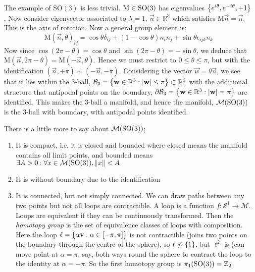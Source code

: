 \begin{examplebox}[$\textrm{SO}(3)$]
The example of $\textrm{SO}(3)$ is less trivial. $\text{M} \in \SO{3}$ has eigenvalues $\set{e^{i\theta}, e^{-i\theta}, +1}$. Now consider eigenvector associated to $\lambda = 1$, $\vec n \in \mathbb{R}^3$ which satisfies $\text{M} \vec n = \vec n$. This is the axis of rotation. Now a general group element is;
\begin{equation}
\text{M}(\vec n, \theta)_{ij} = \cos \theta \delta_{ij} + (1- \cos \theta) n_i n_j + \sin \theta \epsilon_{ijk} n_k
\end{equation}
Now since $\cos(2\pi - \theta) = \cos \theta$ and $\sin(2\pi - \theta) = -\sin \theta$, we deduce that $\text{M}(\vec n, 2\pi - \theta) = \text{M}(-\vec n, \theta)$. Hence we must restrict to $0 \leq \theta \leq \pi$, but with the identification $(\vec n, +\pi) \sim (-\vec n, -\pi)$. Considering the vector $\vec w = \theta \vec n$, we see that it lies within the $3$-ball, $\mathcal{B}_3 = \set{\vec w \in \mathbb{R}^3 : \abs{\vec w} \leq \pi} \subset \mathbb{R}^3$ with the additional structure that antipodal points on the boundary, $\del \mathcal{B}_3 = \set{\vec w \in \mathbb{R}^3 : \abs{\vec w} = \pi}$ are identified. This makes the $3$-ball a manifold, and hence the manifold, $\mathcal{M}\left(\SO{3}\right)$ is the $3$-ball with boundary, with antipodal points identified.\footnotemark
\end{examplebox}
There is a little more to say about $\mathcal{M}\left(\SO{3}\right)$;
\begin{enumerate}
\item It is compact, i.e. it is closed and bounded where closed means the manifold contains all limit points, and bounded means $\exists A > 0 : \forall x \in \mathcal{M}\left(\SO{3}\right), \| x \| < A$
\item It is without boundary due to the identification
\item It is connected, but not simply connected. We can draw paths between any two points but not all loops are contractible. A loop is a function $f : \mathcal{S}^1 \rightarrow \mathcal{M}$. Loops are equivalent if they can be continuously transformed. Then the \emph{homotopy group} is the set of equivalence classes of loops with composition. Here the loop $\ell = \set{\alpha \vec v : \alpha \in [-\pi, \pi]}$ is not contractible (joins two points on the boundary through the centre of the sphere), so $\ell \not\sim \set{1}$, but $\ell^2$ is (can move point at $\alpha = \pi$, say, both ways round the sphere to contract the loop to the identity at $\alpha = - \pi$. So the first homotopy group is $\pi_1\left(\SO{3}\right) = \mathbb{Z}_2$.
\end{enumerate}
